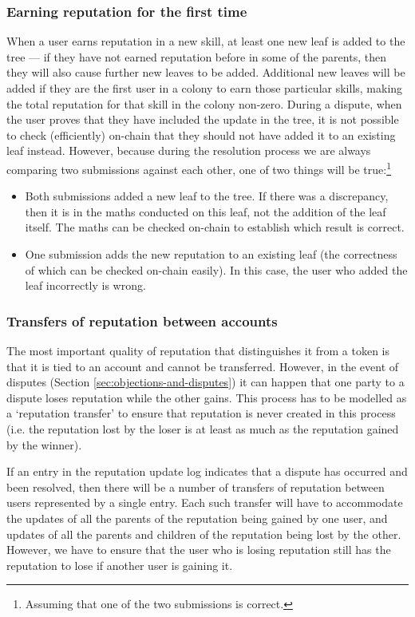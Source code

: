 \subsubsection{Earning reputation for the first time}\label{sec:earning-rep-for-first-time}
When a user earns reputation in a new skill, at least one new leaf is added to the tree --- if they have not earned reputation before in some of the parents, then they will also cause further new leaves to be added. Additional new leaves will be added if they are the first user in a colony to earn those particular skills, making the total reputation for that skill in the colony non-zero. During a dispute, when the user proves that they have included the update in the tree, it is not possible to check (efficiently) on-chain that they should not have added it to an existing leaf instead. However, because during the resolution process we are always comparing two submissions against each other, one of two things will be true:\footnote{Assuming that one of the two submissions is correct.}
\begin{itemize}
 \item Both submissions added a new leaf to the tree. If there was a discrepancy, then it is in the maths conducted on this leaf, not the addition of the leaf itself. The maths can be checked on-chain to establish which result is correct.
 \item One submission adds the new reputation to an existing leaf (the correctness of which can be checked on-chain easily). In this case, the user who added the leaf incorrectly is wrong.
\end{itemize}

\subsubsection{Transfers of reputation between accounts}\label{sec:reptransfer}

The most important quality of reputation that distinguishes it from a token is that it is tied to an account and cannot be transferred. However, in the event of disputes (Section \ref{sec:objections-and-disputes}) it can happen that one party to a dispute loses reputation while the other gains. This process has to be modelled as a `reputation transfer' to ensure that reputation is never created in this process (i.e. the reputation lost by the loser is at least as much as the reputation gained by the winner).

If an entry in the reputation update log indicates that a dispute has occurred and been resolved, then there will be a number of transfers of reputation between users represented by a single entry. Each such transfer will have to accommodate the updates of all the parents of the reputation being gained by one user, and updates of all the parents and children of the reputation being lost by the other. However, we have to ensure that the user who is losing reputation still has the reputation to lose if another user is gaining it.

